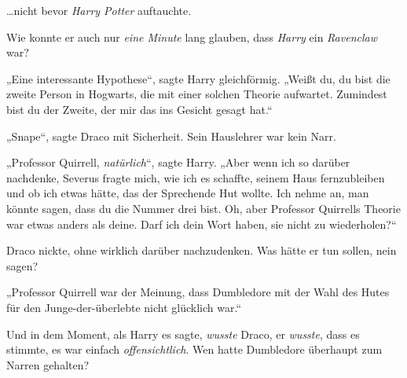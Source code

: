 …nicht bevor \emph{Harry Potter} auftauchte.

Wie konnte er auch nur \emph{eine Minute} lang glauben, dass \emph{Harry} ein \emph{Ravenclaw} war?

„Eine interessante Hypothese“, sagte Harry gleichförmig. „Weißt du, du bist die zweite Person in Hogwarts, die mit einer solchen Theorie aufwartet. Zumindest bist du der Zweite, der mir das ins Gesicht gesagt hat.“

„Snape“, sagte Draco mit Sicherheit. Sein Hauslehrer war kein Narr.

„Professor Quirrell, \emph{natürlich}“, sagte Harry. „Aber wenn ich so darüber nachdenke, Severus fragte mich, wie ich es schaffte, seinem Haus fernzubleiben und ob ich etwas hätte, das der Sprechende Hut wollte. Ich nehme an, man könnte sagen, dass du die Nummer drei bist. Oh, aber Professor Quirrells Theorie war etwas anders als deine. Darf ich dein Wort haben, sie nicht zu wiederholen?“

Draco nickte, ohne wirklich darüber nachzudenken. Was hätte er tun sollen, nein sagen?

„Professor Quirrell war der Meinung, dass Dumbledore mit der Wahl des Hutes für den Junge-der-überlebte nicht glücklich war.“

Und in dem Moment, als Harry es sagte, \emph{wusste} Draco, er \emph{wusste}, dass es stimmte, es war einfach \emph{offensichtlich}. Wen hatte Dumbledore überhaupt zum Narren gehalten?

